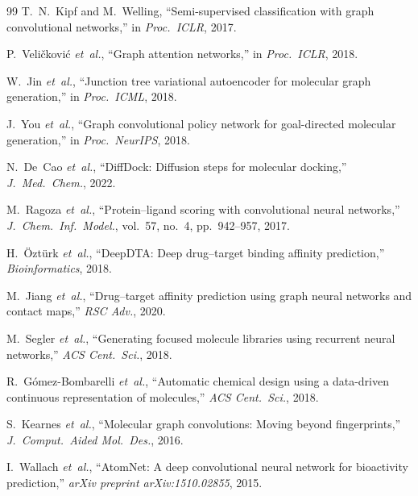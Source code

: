 \documentclass[conference]{IEEEtran}
\begin{document}
\begin{thebibliography}{99}
T.~N.~Kipf and M.~Welling,
``Semi-supervised classification with graph convolutional networks,''
in \emph{Proc.\ ICLR}, 2017.

P.~Veli\v{c}kovi\'c \emph{et~al.},
``Graph attention networks,''
in \emph{Proc.\ ICLR}, 2018.

W.~Jin \emph{et~al.},
``Junction tree variational autoencoder for molecular graph generation,''
in \emph{Proc.\ ICML}, 2018.

J.~You \emph{et~al.},
``Graph convolutional policy network for goal-directed molecular generation,''
in \emph{Proc.\ NeurIPS}, 2018.

N.~De~Cao \emph{et~al.},
``DiffDock: Diffusion steps for molecular docking,''
\emph{J.\ Med.\ Chem.}, 2022.

M.~Ragoza \emph{et~al.},
``Protein--ligand scoring with convolutional neural networks,''
\emph{J.\ Chem.\ Inf.\ Model.}, vol.~57, no.~4, pp.~942--957, 2017.

H.~\"Ozt\"urk \emph{et~al.},
``DeepDTA: Deep drug--target binding affinity prediction,''
\emph{Bioinformatics}, 2018.

M.~Jiang \emph{et~al.},
``Drug--target affinity prediction using graph neural networks and contact maps,''
\emph{RSC Adv.}, 2020.

M.~Segler \emph{et~al.},
``Generating focused molecule libraries using recurrent neural networks,''
\emph{ACS Cent.\ Sci.}, 2018.

R.~G\'omez-Bombarelli \emph{et~al.},
``Automatic chemical design using a data-driven continuous representation of molecules,''
\emph{ACS Cent.\ Sci.}, 2018.

S.~Kearnes \emph{et~al.},
``Molecular graph convolutions: Moving beyond fingerprints,''
\emph{J.\ Comput.\ Aided Mol.\ Des.}, 2016.

I.~Wallach \emph{et~al.},
``AtomNet: A deep convolutional neural network for bioactivity prediction,''
\emph{arXiv preprint arXiv:1510.02855}, 2015.

\end{thebibliography}
\end{document}
